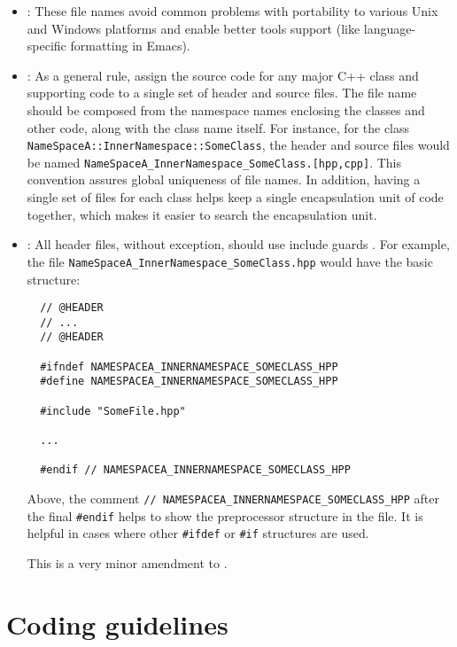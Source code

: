 \begin{itemize}

\item\NOSFFileExtension: These file names avoid common problems with
  portability to various Unix and Windows platforms and enable better
  tools support (like language-specific formatting in Emacs).

\item\NOSFClassFiles: As a general rule, assign the source code for
  any major C++ class and supporting code to a single set of header
  and source files.  The file name should be composed from the
  namespace names enclosing the classes and other code, along with the
  class name itself.  For instance, for the class
  \texttt{NameSpaceA\-::InnerNamespace\-::SomeClass}, the header and
  source files would be named
  \texttt{NameSpaceA\-\_InnerNamespace\-\_SomeClass.[hpp,cpp]}.  This
  convention assures global uniqueness of file names.  In addition,
  having a single set of files for each class helps keep a single
  encapsulation unit of code together, which makes it easier to search
  the encapsulation unit.

\item\NOSFIncludeGuards: All header files, without exception, should
  use include guards {}\cite[Item 24]{C++CodingStandards05}.  For
  example, the file
  {}\texttt{NameSpaceA\-\_InnerNamespace\-\_SomeClass.hpp} would have
  the basic structure:

{\small\begin{verbatim}
  // @HEADER
  // ...
  // @HEADER

  #ifndef NAMESPACEA_INNERNAMESPACE_SOMECLASS_HPP
  #define NAMESPACEA_INNERNAMESPACE_SOMECLASS_HPP

  #include "SomeFile.hpp"

  ...

  #endif // NAMESPACEA_INNERNAMESPACE_SOMECLASS_HPP
\end{verbatim}}

  Above, the comment {}\texttt{//
    NAMESPACEA\-\_INNERNAMESPACE\-\_SOMECLASS\-\_HPP} after the final
  \texttt{\#endif} helps to show the preprocessor structure in the
  file.  It is helpful in cases where other \texttt{\#ifdef} or
  \texttt{\#if} structures are used.

This is a very minor amendment to \cite[Item 24]{C++CodingStandards05}.

\end{itemize}


%
\section{Coding guidelines}
\label{tcdg:codingguidelines:sec}
%

